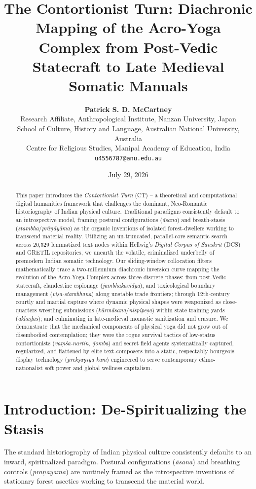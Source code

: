 \documentclass[11pt,twoside,letterpaper]{article}
\title{\textbf{The Contortionist Turn: Diachronic Mapping of the Acro-Yoga Complex from Post-Vedic Statecraft to Late Medieval Somatic Manuals}}
\author{
    \textbf{Patrick S. D. McCartney}\\
    \small Research Affiliate, Anthropological Institute, Nanzan University, Japan \\
    \small School of Culture, History and Language, Australian National University, Australia \\
    \small Centre for Religious Studies, Manipal Academy of Education, India \\
    \small \texttt{u4556787@anu.edu.au}
}
\date{July 29, 2026}
\begin{document}
\maketitle

\begin{abstract}
This paper introduces the \textit{Contortionist Turn} (CT) -- a theoretical and computational digital humanities framework that challenges the dominant, Neo-Romantic historiography of Indian physical culture. Traditional paradigms consistently default to an introspective model, framing postural configurations (\textit{āsana}) and breath-stasis (\textit{stambha}/\textit{prāṇāyāma}) as the organic inventions of isolated forest-dwellers working to transcend material reality. Utilizing an un-truncated, parallel-core semantic search across 20,529 lemmatized text nodes within Hellwig’s \textit{Digital Corpus of Sanskrit} (DCS) and GRETIL repositories, we unearth the volatile, criminalized underbelly of premodern Indian somatic technology. Our sliding-window collocation filters mathematically trace a two-millennium diachronic inversion curve mapping the evolution of the Acro-Yoga Complex across three discrete phases: from post-Vedic statecraft, clandestine espionage (\textit{jambhakavidyā}), and toxicological boundary management (\textit{viṣa-stambhana}) along unstable trade frontiers; through 12th-century courtly and martial capture where dynamic physical shapes were weaponized as close-quarters wrestling submissions (\textit{kūrmāsana}/\textit{niṣpipeṣa}) within state training yards (\textit{akhāḍās}); and culminating in late-medieval monastic sanitization and erasure. We demonstrate that the mechanical components of physical yoga did not grow out of disembodied contemplation; they were the rogue survival tactics of low-status contortionists (\textit{vaṃśa-nartin}, \textit{ḍomba}) and secret field agents systematically captured, regularized, and flattened by elite text-composers into a static, respectably bourgeois display technology (\textit{prekṣaṇīya kām}) engineered to serve contemporary ethno-nationalist soft power and global wellness capitalism.

\vspace{0.3cm}
\end{abstract}

\section{Introduction: De-Spiritualizing the Stasis}
The standard historiography of Indian physical culture consistently defaults to an inward, spiritualized paradigm. Postural configurations (\textit{āsana}) and breathing controls (\textit{prāṇāyāma}) are routinely framed as the introspective inventions of stationary forest ascetics working to transcend the material world. 
\end{document}

